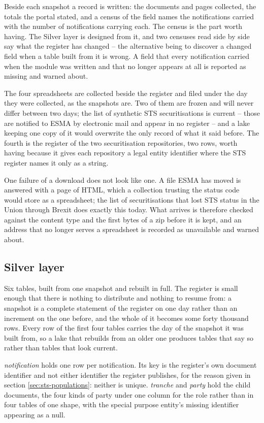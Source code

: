 Beside each snapshot a record is written: the documents and pages collected, the totals the portal stated, and a census of the field names the notifications carried with the number of notifications carrying each. The census is the part worth having. The Silver layer is designed from it, and two censuses read side by side say what the register has changed -- the alternative being to discover a changed field when a table built from it is wrong. A field that every notification carried when the module was written and that no longer appears at all is reported as missing and warned about.

The four spreadsheets are collected beside the register and filed under the day they were collected, as the snapshots are. Two of them are frozen and will never differ between two days; the list of synthetic STS securitisations is current -- those are notified to ESMA by electronic mail and appear in no register -- and a lake keeping one copy of it would overwrite the only record of what it said before. The fourth is the register of the two securitisation repositories, two rows, worth having because it gives each repository a legal entity identifier where the STS register names it only as a string.

One failure of a download does not look like one. A file ESMA has moved is answered with a page of HTML, which a collection trusting the status code would store as a spreadsheet; the list of securitisations that lost STS status in the Union through Brexit does exactly this today. What arrives is therefore checked against the content type and the first bytes of a zip before it is kept, and an address that no longer serves a spreadsheet is recorded as unavailable and warned about.

\subsection{Silver layer}

Six tables, built from one snapshot and rebuilt in full. The register is small enough that there is nothing to distribute and nothing to resume from: a snapshot is a complete statement of the register on one day rather than an increment on the one before, and the whole of it becomes some forty thousand rows. Every row of the first four tables carries the day of the snapshot it was built from, so a lake that rebuilds from an older one produces tables that say so rather than tables that look current.

\emph{notification} holds one row per notification. Its key is the register's own document identifier and not either identifier the register publishes, for the reason given in section \ref{sec:sts-populations}: neither is unique. \emph{tranche} and \emph{party} hold the child documents, the four kinds of party under one column for the role rather than in four tables of one shape, with the special purpose entity's missing identifier appearing as a null.

